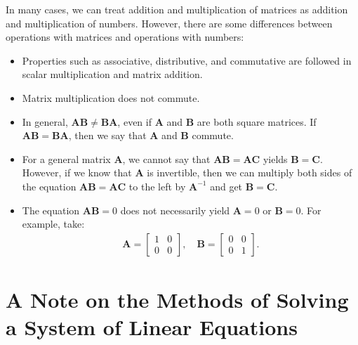 In many cases, we can treat addition and multiplication of matrices as addition and multiplication of numbers. However, there are some differences between operations with matrices and operations with numbers:
\begin{itemize}
    \item Properties such as associative, distributive, and commutative are followed in scalar multiplication and matrix addition.
    \item Matrix multiplication does not commute.
    \item In general, \(\mathbf{AB} \neq \mathbf{BA}\), even if \(\mathbf{A}\) and \(\mathbf{B}\) are both square matrices. If \(\mathbf{AB} = \mathbf{BA}\), then we say that \(\mathbf{A}\) and \(\mathbf{B}\) commute.
    \item For a general matrix \(\mathbf{A}\), we cannot say that \(\mathbf{AB} = \mathbf{AC}\) yields \(\mathbf{B} = \mathbf{C}\). However, if we know that \(\mathbf{A}\) is invertible, then we can multiply both sides of the equation \(\mathbf{AB} = \mathbf{AC}\) to the left by \(\mathbf{A}^{-1}\) and get \(\mathbf{B} = \mathbf{C}\).
    \item The equation \(\mathbf{AB} = 0\) does not necessarily yield \(\mathbf{A} = 0\) or \(\mathbf{B} = 0\). For example, take:
    \begin{align}
    \mathbf{A} = \begin{bmatrix} 1 & 0 \\ 0 & 0 \end{bmatrix}, \quad
    \mathbf{B} = \begin{bmatrix} 0 & 0 \\ 0 & 1 \end{bmatrix}.
    \end{align}
\end{itemize}
\para

\section{A Note on the Methods of Solving a System of Linear Equations}

